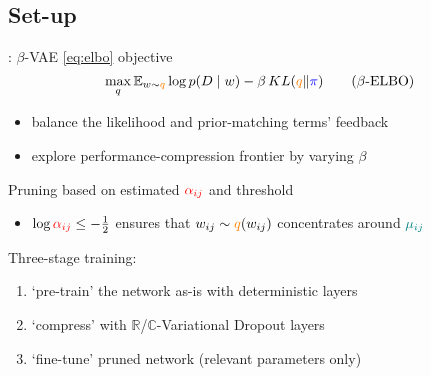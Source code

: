 \documentclass{beamer}
\newcommand{\real}{\mathbb{R}}
\newcommand{\cplx}{\mathbb{C}}
\begin{document}

\subsection{Set-up} %
\label{sub:details}

\begin{frame}[c]{\insertsection: \insertsubsection}
  $\beta$-VAE \ref{eq:elbo} objective {\tiny \citep{higgins_beta-vae_2017}}
  \begin{equation}
  \label{eq:beta_elbo}
    \max_q
    \mathbb{E}_{w \sim {\color{orange} q}}
      \log p(D \mid w)  %
      - \beta \mathop{KL}({\color{orange} q}\|{\color{blue} \pi})
    \tag{$\beta$-ELBO}
  \end{equation}
  \vspace{-1em}
  \begin{itemize}
    \item balance the likelihood and prior-matching terms' feedback
    \item explore performance-compression frontier by varying $\beta$
  \end{itemize}

  \pause
  \medskip
  Pruning based on estimated ${\color{red} \alpha_{ij}}$ and threshold
  \begin{itemize}
    \item $
      \log{{\color{red} \alpha_{ij}}} \leq -\tfrac12
    $ ensures that $
      w_{ij} \sim {\color{orange} q}(w_{ij})
    $ concentrates around ${\color{teal} \mu_{ij}}$
  \end{itemize}

  \pause
  \medskip
  Three-stage training:
  \begin{enumerate}
    \item `pre-train' the network as-is with deterministic layers
    \item `compress' with $\real$/$\cplx$-Variational Dropout layers
    \item `fine-tune' pruned network (relevant parameters only)
  \end{enumerate}

\end{frame}
\end{document}
